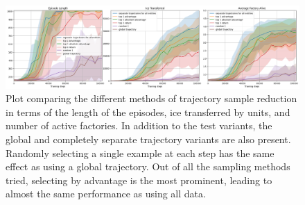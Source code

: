 \begin{figure}[htbp]
    \centering
    \includegraphics[width=1\linewidth]{images/results_hybrid/trajectory_sample_reduction/combined.png}
    \captionsetup{justification=justified, singlelinecheck=false, width=1\linewidth, labelfont=bf} 
    \caption[]{Plot comparing the different methods of trajectory sample reduction in terms of the length of the episodes, ice transferred by units, and number of active factories. In addition to the test variants, the global and completely separate trajectory variants are also present. Randomly selecting a single example at each step has the same effect as using a global trajectory. Out of all the sampling methods tried, selecting by advantage is the most prominent, leading to almost the same performance as using all data.}
    \label{fig:hybrid_results/trajectory_sample_reduction/combined}
\end{figure}


